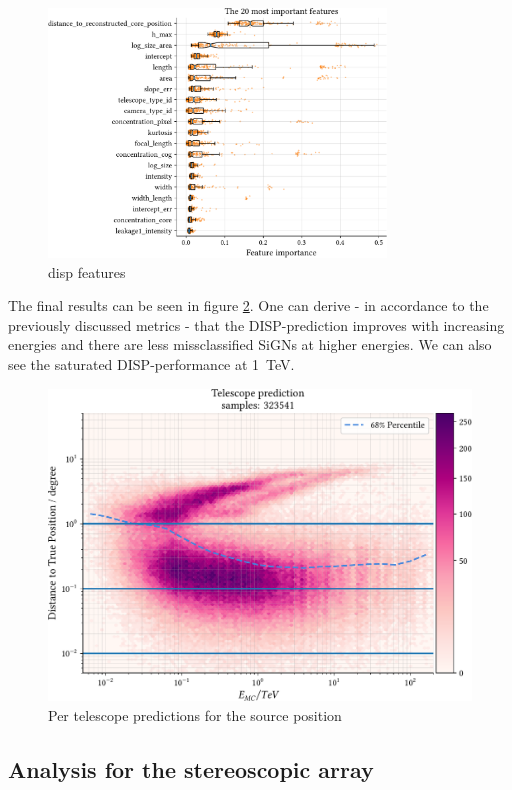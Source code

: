 \begin{figure}
	\centering
	\includegraphics[width=0.8\textwidth]{../analysis/plots/disp_features.pdf}
	\caption{disp features}
	\label{fig:disp_features}
\end{figure}

The final results can be seen in figure \ref{fig:sens_telescope}.
One can derive - in accordance to the previously discussed metrics - 
that the DISP-prediction improves with increasing energies and there are less
missclassified SiGNs at higher energies.
We can also see the saturated DISP-performance at \SI{1}{\tera\electronvolt}.

\begin{figure}
    \centering
    \includegraphics[width=.8\textwidth]{../analysis/plots/gamma/tel_vs_energy.pdf}
    \caption{Per telescope predictions for the source position}
    \label{fig:sens_telescope}
\end{figure}


\subsection{Analysis for the stereoscopic array}

